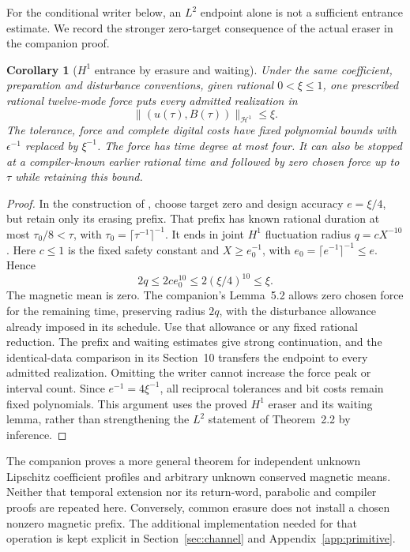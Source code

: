 \documentclass[11pt,a4paper]{amsart}
\newtheorem{corollary}[theorem]{Corollary}
\theoremstyle{definition}
\theoremstyle{remark}
\numberwithin{equation}{section}
\newcommand{\Hcal}{\mathcal H}
\newcommand{\norm}[1]{\lVert #1\rVert}
\begin{document}
For the conditional writer below, an $L^2$ endpoint alone is not a sufficient entrance estimate. We record the stronger zero-target consequence of the actual eraser in the companion proof.

\begin{corollary}[$H^1$ entrance by erasure and waiting]\label{cor:H1eraser}
Under the same coefficient, preparation and disturbance conventions, given rational $0<\xi\le1$, one prescribed rational twelve-mode force puts every admitted realization in
\[
 \norm{(u(\tau),B(\tau))}_{\Hcal^1}\le\xi.
\]
The tolerance, force and complete digital costs have fixed polynomial bounds with $\epsilon^{-1}$ replaced by $\xi^{-1}$. The force has time degree at most four. It can also be stopped at a compiler-known earlier rational time and followed by zero chosen force up to $\tau$ while retaining this bound.
\end{corollary}
\begin{proof}
In the construction of \cite[Section~9.2]{CommonControl}, choose target zero and design accuracy $e=\xi/4$, but retain only its erasing prefix. That prefix has known rational duration at most $\tau_0/8<\tau$, with $\tau_0=\lceil\tau^{-1}\rceil^{-1}$. It ends in joint $H^1$ fluctuation radius $q=cX^{-10}$. Here $c\le1$ is the fixed safety constant and $X\ge e_0^{-1}$, with $e_0=\lceil e^{-1}\rceil^{-1}\le e$. Hence
\[
 2q\le2c e_0^{10}\le2(\xi/4)^{10}\le\xi.
\]
The magnetic mean is zero. The companion's Lemma~5.2 allows zero chosen force for the remaining time, preserving radius $2q$, with the disturbance allowance already imposed in its schedule. Use that allowance or any fixed rational reduction. The prefix and waiting estimates give strong continuation, and the identical-data comparison in its Section~10 transfers the endpoint to every admitted realization. Omitting the writer cannot increase the force peak or interval count. Since $e^{-1}=4\xi^{-1}$, all reciprocal tolerances and bit costs remain fixed polynomials. This argument uses the proved $H^1$ eraser and its waiting lemma, rather than strengthening the $L^2$ statement of Theorem~2.2 by inference.
\end{proof}

The companion proves a more general theorem for independent unknown Lipschitz coefficient profiles and arbitrary unknown conserved magnetic means. Neither that temporal extension nor its return-word, parabolic and compiler proofs are repeated here. Conversely, common erasure does not install a chosen nonzero magnetic prefix. The additional implementation needed for that operation is kept explicit in Section~\ref{sec:channel} and Appendix~\ref{app:primitive}.
\end{document}

